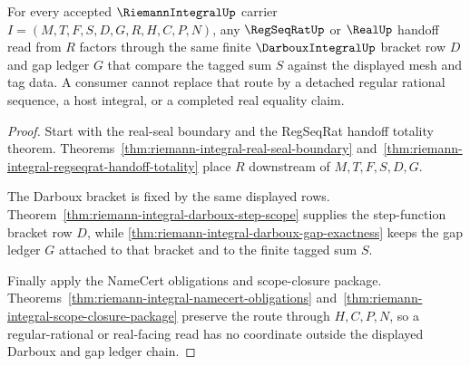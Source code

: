 \begin{theorem}
\label{thm:riemann-integral-darboux-regseqrat-handoff}
For every accepted $\RiemannIntegralUp$ carrier $I=(M,T,F,S,D,G,R,H,C,P,N)$, any $\RegSeqRatUp$ or $\RealUp$ handoff read from $R$ factors through the same finite $\DarbouxIntegralUp$ bracket row $D$ and gap ledger $G$ that compare the tagged sum $S$ against the displayed mesh and tag data. A consumer cannot replace that route by a detached regular rational sequence, a host integral, or a completed real equality claim.
\end{theorem}
\begin{proof}
Start with the real-seal boundary and the RegSeqRat handoff totality theorem. Theorems~\ref{thm:riemann-integral-real-seal-boundary} and~\ref{thm:riemann-integral-regseqrat-handoff-totality} place $R$ downstream of $M,T,F,S,D,G$.

The Darboux bracket is fixed by the same displayed rows. Theorem~\ref{thm:riemann-integral-darboux-step-scope} supplies the step-function bracket row $D$, while \autoref{thm:riemann-integral-darboux-gap-exactness} keeps the gap ledger $G$ attached to that bracket and to the finite tagged sum $S$.

Finally apply the NameCert obligations and scope-closure package. Theorems~\ref{thm:riemann-integral-namecert-obligations} and~\ref{thm:riemann-integral-scope-closure-package} preserve the route through $H,C,P,N$, so a regular-rational or real-facing read has no coordinate outside the displayed Darboux and gap ledger chain.
\end{proof}

